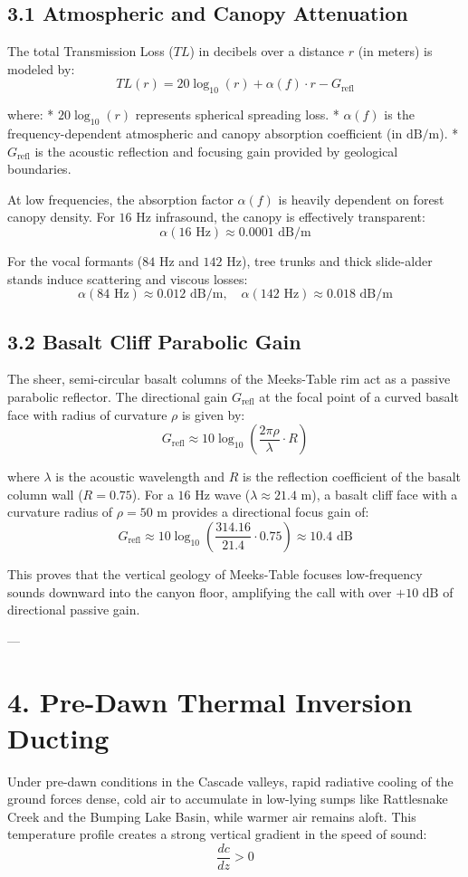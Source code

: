 \documentclass[11pt,twocolumn]{article}
\begin{document}
\subsection{3.1 Atmospheric and Canopy Attenuation}
The total Transmission Loss ($TL$) in decibels over a distance $r$ (in meters) is modeled by:
$$TL(r) = 20 \log_{10}(r) + \alpha(f) \cdot r - G_{\text{refl}}$$

where:
*   $20 \log_{10}(r)$ represents spherical spreading loss.
*   $\alpha(f)$ is the frequency-dependent atmospheric and canopy absorption coefficient (in $\text{dB/m}$).
*   $G_{\text{refl}}$ is the acoustic reflection and focusing gain provided by geological boundaries.

At low frequencies, the absorption factor $\alpha(f)$ is heavily dependent on forest canopy density. For $16\text{ Hz}$ infrasound, the canopy is effectively transparent:
$$\alpha(16\text{ Hz}) \approx 0.0001 \text{ dB/m}$$

For the vocal formants ($84\text{ Hz}$ and $142\text{ Hz}$), tree trunks and thick slide-alder stands induce scattering and viscous losses:
$$\alpha(84\text{ Hz}) \approx 0.012 \text{ dB/m}, \quad \alpha(142\text{ Hz}) \approx 0.018 \text{ dB/m}$$

\subsection{3.2 Basalt Cliff Parabolic Gain}
The sheer, semi-circular basalt columns of the Meeks-Table rim act as a passive parabolic reflector. The directional gain $G_{\text{refl}}$ at the focal point of a curved basalt face with radius of curvature $\rho$ is given by:
$$G_{\text{refl}} \approx 10 \log_{10} \left( \frac{2\pi \rho}{\lambda} \cdot R \right)$$

where $\lambda$ is the acoustic wavelength and $R$ is the reflection coefficient of the basalt column wall ($R = 0.75$). For a $16\text{ Hz}$ wave ($\lambda \approx 21.4\text{ m}$), a basalt cliff face with a curvature radius of $\rho = 50\text{ m}$ provides a directional focus gain of:
$$G_{\text{refl}} \approx 10 \log_{10} \left( \frac{314.16}{21.4} \cdot 0.75 \right) \approx 10.4 \text{ dB}$$

This proves that the vertical geology of Meeks-Table focuses low-frequency sounds downward into the canyon floor, amplifying the call with over $+10\text{ dB}$ of directional passive gain.

---

\section{4. Pre-Dawn Thermal Inversion Ducting}
Under pre-dawn conditions in the Cascade valleys, rapid radiative cooling of the ground forces dense, cold air to accumulate in low-lying sumps like Rattlesnake Creek and the Bumping Lake Basin, while warmer air remains aloft. This temperature profile creates a strong vertical gradient in the speed of sound:
$$\frac{dc}{dz} > 0$$
\end{document}
